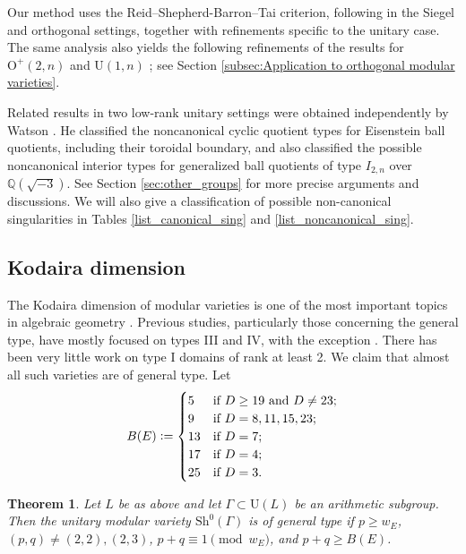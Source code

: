 \documentclass[11pt]{amsart}
\theoremstyle{plain}
\newtheorem{thm}{Theorem}[section]
\theoremstyle{definition}
\numberwithin{equation}{section}
\def\U{\mathrm{U}}
\def\O{\mathrm{O}}
\newcommand{\defeq}{\vcentcolon=}
\begin{document}
Our method uses the Reid--Shepherd-Barron--Tai criterion, following \cites{tai1982kodaira,kondo1993kodaira,Gritsenko2007kodaira} in the Siegel and orthogonal settings, together with refinements specific to the unitary case.
The same analysis also yields the following refinements of the results for $\O^+(2,n)$ \cite{Gritsenko2007kodaira} and $\U(1,n)$ \cite{behrens2012singularities}; see Section \ref{subsec:Application to orthogonal modular varieties}.

Related results in two low-rank unitary settings were obtained
independently by Watson \cite{watson2026singularities}.  He classified the
noncanonical cyclic quotient types for Eisenstein ball
quotients, including their toroidal boundary, and also classified
the possible noncanonical interior types for generalized ball
quotients of type $I_{2,n}$ over
$\mathbb Q(\sqrt{-3})$.
See Section \ref{sec:other_groups} for more precise arguments and discussions.
We will also give a classification of possible non-canonical singularities in Tables \ref{list_canonical_sing} and \ref{list_noncanonical_sing}.


\subsection{Kodaira dimension}
The Kodaira dimension of modular varieties is one of the most important topics in algebraic geometry \cites{tai1982kodaira,freitag1983Siegelsche,mumford1977hirzebruch,kondo1993kodaira,Gritsenko2007kodaira,ma2018kodaira,2025_HMY_Kodaira_dimension_ball_quotients}.
Previous studies, particularly those concerning the general type, have mostly focused on types III and IV, with the exception \cite{2025_HMY_Kodaira_dimension_ball_quotients}.  There has been very little work on type I domains of rank at least 2. 
We claim that almost all such varieties are of general type.
Let     
\begin{equation}\label{def_B(E)}
B(E)\defeq 
\begin{cases}
    5 & \text{if $D \geq 19$ and $D \neq 23$;}\\
    9 & \text{if $D =8, 11, 15, 23$;}\\
    13 & \text{if $D =7$;}\\
    17 & \text{if $D=4$;}\\
    25 & \text{if $D=3$.}
\end{cases}
\end{equation}

\begin{thm}
    \label{mainthm:general type}
    Let $L$ be as above and let $\Gamma\subset \U(L)$ be an arithmetic subgroup.
    Then the unitary modular variety $\mathrm{Sh}^0(\Gamma)$ is of general type if $p \geq w_E$, $(p,q) \neq (2,2),(2,3)$, $p+q\equiv 1 \pmod{w_E}$, and $p+q \geq B(E)$.

\end{thm}
\end{document}
